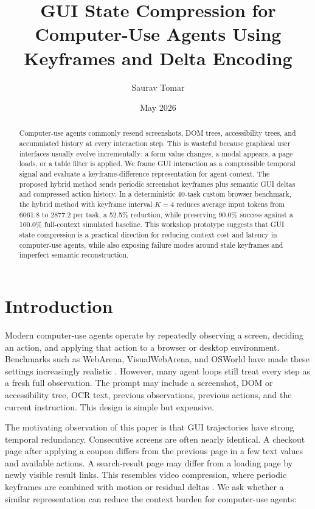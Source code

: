 \documentclass[11pt]{article}
\title{GUI State Compression for Computer-Use Agents Using Keyframes and Delta Encoding}
\author{Saurav Tomar}
\date{May 2026}
\begin{document}
\maketitle

\begin{abstract}
Computer-use agents commonly resend screenshots, DOM trees, accessibility trees, and accumulated history at every interaction step. This is wasteful because graphical user interfaces usually evolve incrementally: a form value changes, a modal appears, a page loads, or a table filter is applied. We frame GUI interaction as a compressible temporal signal and evaluate a keyframe-difference representation for agent context. The proposed hybrid method sends periodic screenshot keyframes plus semantic GUI deltas and compressed action history. In a deterministic 40-task custom browser benchmark, the hybrid method with keyframe interval $K=4$ reduces average input tokens from 6061.8 to 2877.2 per task, a 52.5\% reduction, while preserving 90.0\% success against a 100.0\% full-context simulated baseline. This workshop prototype suggests that GUI state compression is a practical direction for reducing context cost and latency in computer-use agents, while also exposing failure modes around stale keyframes and imperfect semantic reconstruction.
\end{abstract}

\section{Introduction}

Modern computer-use agents operate by repeatedly observing a screen, deciding an action, and applying that action to a browser or desktop environment. Benchmarks such as WebArena, VisualWebArena, and OSWorld have made these settings increasingly realistic \cite{zhou2023webarena,koh2024visualwebarena,xie2024osworld}. However, many agent loops still treat every step as a fresh full observation. The prompt may include a screenshot, DOM or accessibility tree, OCR text, previous observations, previous actions, and the current instruction. This design is simple but expensive.

The motivating observation of this paper is that GUI trajectories have strong temporal redundancy. Consecutive screens are often nearly identical. A checkout page after applying a coupon differs from the previous page in a few text values and available actions. A search-result page may differ from a loading page by newly visible result links. This resembles video compression, where periodic keyframes are combined with motion or residual deltas \cite{wiegand2003h264}. We ask whether a similar representation can reduce the context burden for computer-use agents:
\end{document}
